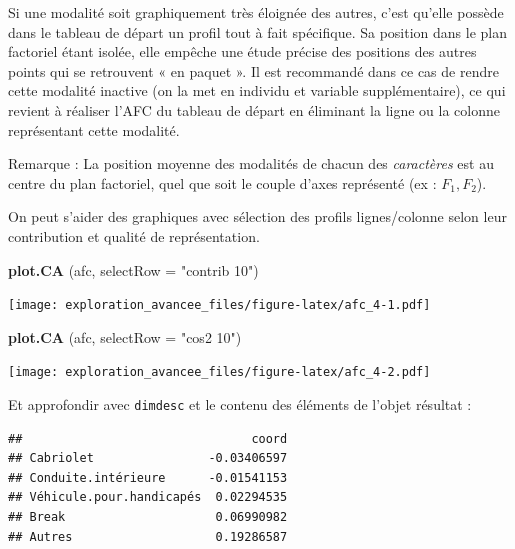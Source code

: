 \documentclass[]{book}
\newenvironment{Shaded}{\begin{snugshade}}{\end{snugshade}}
\newcommand{\DataTypeTok}[1]{\textcolor[rgb]{0.13,0.29,0.53}{#1}}
\newcommand{\DecValTok}[1]{\textcolor[rgb]{0.00,0.00,0.81}{#1}}
\newcommand{\KeywordTok}[1]{\textcolor[rgb]{0.13,0.29,0.53}{\textbf{#1}}}
\newcommand{\NormalTok}[1]{#1}
\newcommand{\OperatorTok}[1]{\textcolor[rgb]{0.81,0.36,0.00}{\textbf{#1}}}
\newcommand{\StringTok}[1]{\textcolor[rgb]{0.31,0.60,0.02}{#1}}
\begin{document}
Si une modalité soit graphiquement très éloignée des autres, c'est qu'elle possède dans le tableau de départ un profil tout à fait spécifique. Sa position dans le plan factoriel étant isolée, elle empêche une étude précise des positions des autres points qui se retrouvent « en paquet ». Il est recommandé dans ce cas de rendre cette modalité inactive (on la met en individu et variable supplémentaire), ce qui revient à réaliser l'AFC du tableau de départ en éliminant la ligne ou la colonne représentant cette modalité.

Remarque : La position moyenne des modalités de chacun des \emph{caractères} est au centre du plan factoriel, quel que soit le couple d'axes représenté (ex : \(F_1, F_2\)).

On peut s'aider des graphiques avec sélection des profils lignes/colonne selon leur contribution et qualité de représentation.

\begin{Shaded}
\begin{Highlighting}[]
\KeywordTok{plot.CA}\NormalTok{ (afc, }\DataTypeTok{selectRow =} \StringTok{"contrib 10"}\NormalTok{)  }
\end{Highlighting}
\end{Shaded}

\texttt{[image: exploration\_avancee\_files/figure-latex/afc\_4-1.pdf]}

\begin{Shaded}
\begin{Highlighting}[]
\KeywordTok{plot.CA}\NormalTok{ (afc, }\DataTypeTok{selectRow =} \StringTok{"cos2 10"}\NormalTok{)  }
\end{Highlighting}
\end{Shaded}

\texttt{[image: exploration\_avancee\_files/figure-latex/afc\_4-2.pdf]}

Et approfondir avec \texttt{dimdesc} et le contenu des éléments de l'objet résultat :

\begin{Shaded}
\end{Shaded}

\begin{verbatim}
##                                coord
## Cabriolet                -0.03406597
## Conduite.intérieure      -0.01541153
## Véhicule.pour.handicapés  0.02294535
## Break                     0.06990982
## Autres                    0.19286587
\end{verbatim}
\end{document}
